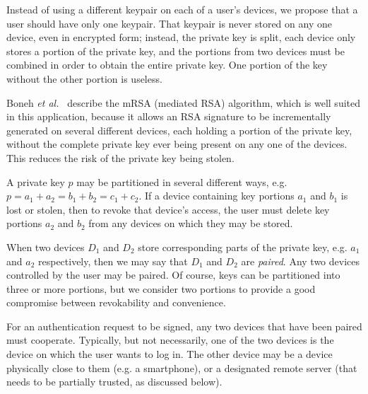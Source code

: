 Instead of using a different keypair on each of a user's devices, we propose that a user should have
only one keypair. That keypair is never stored on any one device, even in encrypted form; instead,
the private key is split, each device only stores a portion of the private key, and the portions
from two devices must be combined in order to obtain the entire private key. One portion of the key
without the other portion is useless.

Boneh \emph{et al.}~\cite{Boneh01} describe the mRSA (mediated RSA) algorithm, which is well suited
in this application, because it allows an RSA signature to be incrementally generated on several
different devices, each holding a portion of the private key, without the complete private key ever
being present on any one of the devices. This reduces the risk of the private key being stolen.

A private key $p$ may be partitioned in several different ways, e.g. $p = a_1+a_2 = b_1+b_2 =
c_1+c_2$. If a device containing key portions $a_1$ and $b_1$ is lost or stolen, then to revoke that
device's access, the user must delete key portions $a_2$ and $b_2$ from any devices on which they
may be stored.

When two devices $D_1$ and $D_2$ store corresponding parts of the private key, e.g. $a_1$ and $a_2$
respectively, then we may say that $D_1$ and $D_2$ are \emph{paired}. Any two devices controlled by
the user may be paired. Of course, keys can be partitioned into three or more portions, but we
consider two portions to provide a good compromise between revokability and convenience.

For an authentication request to be signed, any two devices that have been paired must cooperate.
Typically, but not necessarily, one of the two devices is the device on which the user wants to log
in. The other device may be a device physically close to them (e.g. a smartphone), or a designated
remote server (that needs to be partially trusted, as discussed below).


